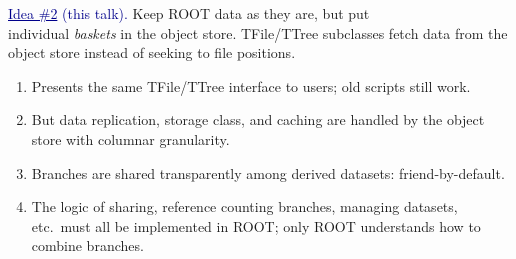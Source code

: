 \documentclass[aspectratio=169]{beamer}
\begin{document}



\begin{frame}{}
\vspace{1 cm}
\begin{center}
\Large \textcolor{darkblue}{\underline{Idea \#2} (this talk).} Keep ROOT data as they are, but put \\ individual {\it baskets} in the object store. TFile/TTree subclasses fetch data from the object store instead of seeking to file positions.
\end{center}

\begin{enumerate}
\item<2-> Presents the same TFile/TTree interface to users; old scripts still work.
\item<3-> But data replication, storage class, and caching are handled by the object store with columnar granularity.
\item<4-> Branches are shared transparently among derived datasets: friend-by-default.
\item<5-> The logic of sharing, reference counting branches, managing datasets, etc.\ must all be implemented in ROOT; only ROOT understands how to combine branches.
\end{enumerate}

\begin{center}
\end{center}
\end{frame}
\end{document}
